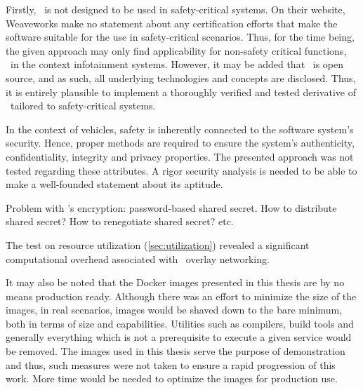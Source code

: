 Firstly, \wnet\ is not designed to be used in safety-critical systems. On their website, Weaveworks make no statement about any certification efforts that make the software suitable for the use in safety-critical scenarios. Thus, for the time being, the given approach may only find applicability for non-safety critical functions, \eg\ in the context infotainment systems. However, it may be added that \wnet\ is open source, and as such, all underlying technologies and concepts are disclosed. Thus, it is entirely plausible to implement a thoroughly verified and tested derivative of \wnet\ tailored to safety-critical systems.

In the context of vehicles, safety is inherently connected to the software system's security. Hence, proper methods are required to ensure the system's authenticity, confidentiality, integrity and privacy properties. The presented approach was not tested regarding these attributes. A rigor security analysis is needed to be able to make a well-founded statement about its aptitude.

Problem with \wnet 's encryption: password-based shared secret. How to distribute shared secret? How to renegotiate shared secret? etc.

The test on resource utilization (\cf \autoref{sec:utilization}) revealed a significant computational overhead associated with \wnet\ overlay networking. 

It may also be noted that the Docker images presented in this thesis are by no means production ready. Although there was an effort to minimize the size of the images, in real scenarios, images would be shaved down to the bare minimum, both in terms of size and capabilities. Utilities such as compilers, build tools and generally everything which is not a prerequisite to execute a given service would be removed. The images used in this thesis serve the purpose of demonstration and thus, such measures were not taken to ensure a rapid progression of this work. More time would be needed to optimize the images for production use.

